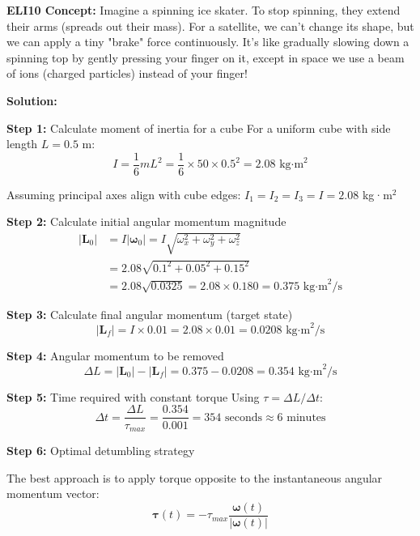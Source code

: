 \documentclass[11pt,a4paper]{article}
\begin{document}
\textbf{ELI10 Concept:} Imagine a spinning ice skater. To stop spinning, they extend their arms (spreads out their mass). For a satellite, we can't change its shape, but we can apply a tiny "brake" force continuously. It's like gradually slowing down a spinning top by gently pressing your finger on it, except in space we use a beam of ions (charged particles) instead of your finger!

\textbf{Solution:}

\textbf{Step 1:} Calculate moment of inertia for a cube
For a uniform cube with side length $L = 0.5$ m:
\begin{equation}
I = \frac{1}{6}mL^2 = \frac{1}{6} \times 50 \times 0.5^2 = 2.08 \text{ kg·m}^2
\end{equation}

Assuming principal axes align with cube edges: $I_1 = I_2 = I_3 = I = 2.08$ kg·m$^2$

\textbf{Step 2:} Calculate initial angular momentum magnitude
\begin{align}
|\mathbf{L}_0| &= I|\boldsymbol{\omega}_0| = I\sqrt{\omega_x^2 + \omega_y^2 + \omega_z^2} \\
&= 2.08\sqrt{0.1^2 + 0.05^2 + 0.15^2} \\
&= 2.08\sqrt{0.0325} = 2.08 \times 0.180 = 0.375 \text{ kg·m}^2\text{/s}
\end{align}

\textbf{Step 3:} Calculate final angular momentum (target state)
\begin{equation}
|\mathbf{L}_f| = I \times 0.01 = 2.08 \times 0.01 = 0.0208 \text{ kg·m}^2\text{/s}
\end{equation}

\textbf{Step 4:} Angular momentum to be removed
\begin{equation}
\Delta L = |\mathbf{L}_0| - |\mathbf{L}_f| = 0.375 - 0.0208 = 0.354 \text{ kg·m}^2\text{/s}
\end{equation}

\textbf{Step 5:} Time required with constant torque
Using $\tau = \Delta L / \Delta t$:
\begin{equation}
\Delta t = \frac{\Delta L}{\tau_{max}} = \frac{0.354}{0.001} = 354 \text{ seconds} \approx 6 \text{ minutes}
\end{equation}

\textbf{Step 6:} Optimal detumbling strategy

The best approach is to apply torque opposite to the instantaneous angular momentum vector:
\begin{equation}
\boldsymbol{\tau}(t) = -\tau_{max} \frac{\boldsymbol{\omega}(t)}{|\boldsymbol{\omega}(t)|}
\end{equation}
\end{document}
